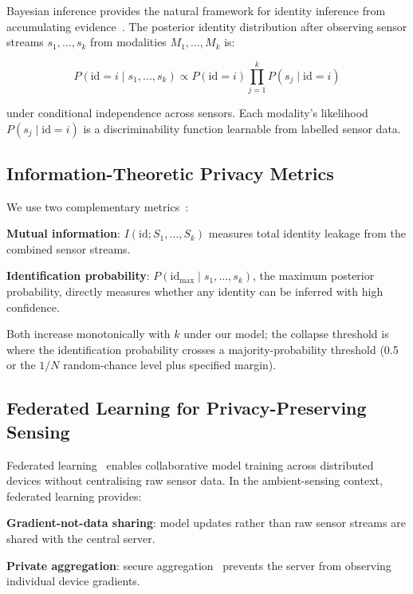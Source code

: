 \documentclass[sigconf,nonacm]{acmart}
\begin{document}
Bayesian inference provides the natural framework for identity
inference from accumulating
evidence~\cite{bishop2006prml,murphy2022probabilistic}. The
posterior identity distribution after observing sensor streams
$s_1, \ldots, s_k$ from modalities $M_1, \ldots, M_k$ is:

\begin{equation}
  P(\text{id} = i \mid s_1,\ldots,s_k) \propto P(\text{id} = i)
  \prod_{j=1}^{k} P(s_j \mid \text{id} = i)
\label{eq:posterior}
\end{equation}

under conditional independence across sensors. Each modality's
likelihood $P(s_j \mid \text{id} = i)$ is a discriminability
function learnable from labelled sensor data.

\subsection{Information-Theoretic Privacy Metrics}

We use two complementary metrics~\cite{dwork2006dp,
makhdoumi2014privacy}:

\textbf{Mutual information}: $I(\text{id}; S_1, \ldots, S_k)$
measures total identity leakage from the combined sensor
streams.

\textbf{Identification probability}: $P(\text{id}_{\max} \mid
s_1, \ldots, s_k)$, the maximum posterior probability, directly
measures whether any identity can be inferred with high
confidence.

Both increase monotonically with $k$ under our model; the
collapse threshold is where the identification probability
crosses a majority-probability threshold (0.5 or the
$1/N$ random-chance level plus specified margin).

\subsection{Federated Learning for Privacy-Preserving Sensing}

Federated learning~\cite{mcmahan2017fedavg,kairouz2024fedml}
enables collaborative model training across distributed devices
without centralising raw sensor data. In the ambient-sensing
context, federated learning provides:

\textbf{Gradient-not-data sharing}: model updates rather than
raw sensor streams are shared with the central server.

\textbf{Private aggregation}: secure aggregation~\cite{bonawitz2017secagg}
prevents the server from observing individual device gradients.
\end{document}
